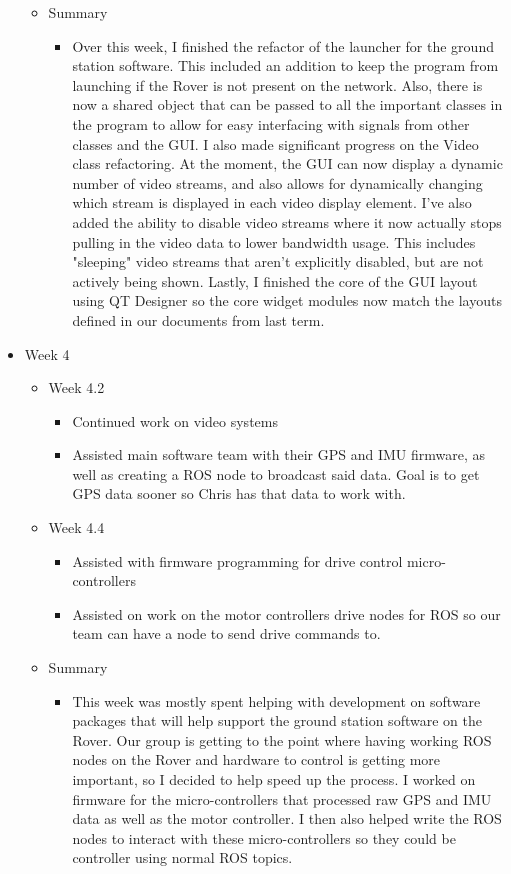 \begin{itemize}
\begin{itemize}
    \item Summary
      \begin{itemize}
      \item Over this week, I finished the refactor of the launcher for the ground station software. This included an addition to keep the program from launching if the Rover is not present on the network. Also, there is now a shared object that can be passed to all the important classes in the program to allow for easy interfacing with signals from other classes and the GUI. I also made significant progress on the Video class refactoring. At the moment, the GUI can now display a dynamic number of video streams, and also allows for dynamically changing which stream is displayed in each video display element. I've also added the ability to disable video streams where it now actually stops pulling in the video data to lower bandwidth usage. This includes "sleeping" video streams that aren't explicitly disabled, but are not actively being shown. Lastly, I finished the core of the GUI layout using QT Designer so the core widget modules now match the layouts defined in our documents from last term. 
      \end{itemize}
	\end{itemize}

\item Week 4
	\begin{itemize}
	\item Week 4.2
      \begin{itemize}
      \item Continued work on video systems 
      \item Assisted main software team with their GPS and IMU firmware, as well as creating a ROS node to broadcast said data. Goal is to get GPS data sooner so Chris has that data to work with. 
      \end{itemize}
	\item Week 4.4
      \begin{itemize}
      \item Assisted with firmware programming for drive control micro-controllers 
      \item Assisted on work on the motor controllers drive nodes for ROS so our team can have a node to send drive commands to. 
      \end{itemize}
    
    \item Summary
      \begin{itemize}
      \item This week was mostly spent helping with development on software packages that will help support the ground station software on the Rover. Our group is getting to the point where having working ROS nodes on the Rover and hardware to control is getting more important, so I decided to help speed up the process. I worked on firmware for the micro-controllers that processed raw GPS and IMU data as well as the motor controller. I then also helped write the ROS nodes to interact with these micro-controllers so they could be controller using normal ROS topics. 
      \end{itemize}
	\end{itemize}


\end{itemize}
